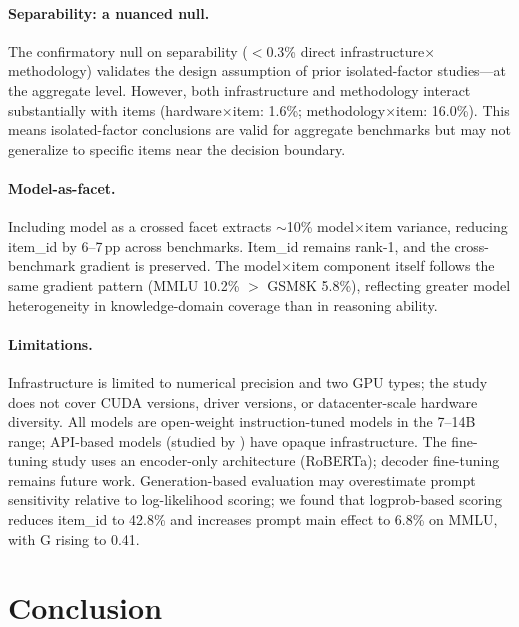 \documentclass[11pt]{article}
\newcommand{\pp}{\,\text{pp}}
\begin{document}
\paragraph{Separability: a nuanced null.}
The confirmatory null on separability ($<$0.3\% direct infrastructure$\times$methodology) validates the design assumption of prior isolated-factor studies---at the aggregate level. However, both infrastructure and methodology interact substantially with items (hardware$\times$item: 1.6\%; methodology$\times$item: 16.0\%). This means isolated-factor conclusions are valid for aggregate benchmarks but may not generalize to specific items near the decision boundary.

\paragraph{Model-as-facet.}
Including model as a crossed facet extracts $\sim$10\% model$\times$item variance, reducing item\_id by 6--7$\pp$ across benchmarks. Item\_id remains rank-1, and the cross-benchmark gradient is preserved. The model$\times$item component itself follows the same gradient pattern (MMLU 10.2\% $>$ GSM8K 5.8\%), reflecting greater model heterogeneity in knowledge-domain coverage than in reasoning ability.

\paragraph{Limitations.}
Infrastructure is limited to numerical precision and two GPU types; the study does not cover CUDA versions, driver versions, or datacenter-scale hardware diversity. All models are open-weight instruction-tuned models in the 7--14B range; API-based models (studied by \citet{mesting2026gtheory}) have opaque infrastructure. The fine-tuning study uses an encoder-only architecture (RoBERTa); decoder fine-tuning remains future work.
Generation-based evaluation may overestimate prompt sensitivity relative to log-likelihood scoring; we found that logprob-based scoring reduces item\_id to 42.8\% and increases prompt main effect to 6.8\% on MMLU, with G rising to 0.41.


\section{Conclusion}
\end{document}
